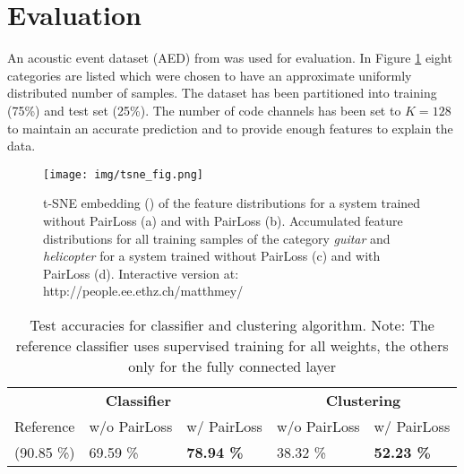 \documentclass{article} %
\begin{document}
\section{Evaluation}
An acoustic event dataset (AED) from \cite{takahashi_deep_2016} was used for evaluation. In Figure \ref{fig_tsne} eight categories are listed which were chosen to have an approximate uniformly distributed number of samples. The dataset has been partitioned into training (75\%) and test set (25\%). The number of code channels has been set to $K=128$ to maintain an accurate prediction and to provide enough features to explain the data.

\begin{figure}[h]
	\begin{center}
		\texttt{[image: img/tsne\_fig.png]}
	\end{center}
	\caption{t-SNE embedding (\cite{maaten_visualizing_2008}) of the feature distributions for a system trained without PairLoss (a) and with PairLoss (b). Accumulated feature distributions for all training samples of the category \emph{guitar} and \emph{helicopter} for a system trained without PairLoss (c) and with PairLoss (d). Interactive version at: http://people.ee.ethz.ch/matthmey/  }
	\label{fig_tsne}
\end{figure}

\begin{table}[h]
\caption{Test accuracies for classifier and clustering algorithm. Note: The reference classifier uses supervised training for all weights, the others only for the fully connected layer}
\label{tab_acc}
\begin{center}
\begin{tabular}{lll|ll}
\multicolumn{3}{c|}{\bf Classifier} & \multicolumn{2}{c}{\bf Clustering} \\
Reference & w/o PairLoss & w/ PairLoss & w/o PairLoss & w/ PairLoss
\\ \hline
(90.85 \%) & 69.59 \% & \bf 78.94  \% & 38.32 \% & \bf 52.23 \% \\

\end{tabular}
\end{center}
\end{table}
\end{document}
